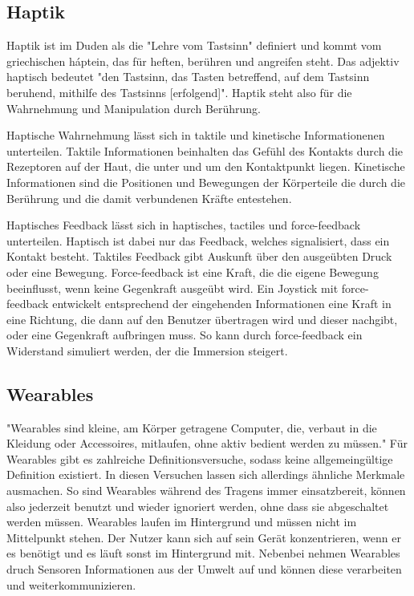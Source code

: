 \documentclass[ngerman,runningheads,a4paper]{llncs}
\begin{document}
\subsection{Haptik}
Haptik ist im Duden als die "Lehre vom Tastsinn"\cite{Haptik} definiert und kommt vom griechischen h\'{a}ptein, das für heften, berühren und angreifen steht. Das adjektiv haptisch bedeutet "den Tastsinn, das Tasten betreffend, auf dem Tastsinn beruhend, mithilfe des Tastsinns [erfolgend]"\cite{haptisch}. Haptik steht also für die Wahrnehmung und Manipulation durch Berührung.

Haptische Wahrnehmung lässt sich in taktile und kinetische Informationenen unterteilen. Taktile Informationen beinhalten das Gefühl des Kontakts durch die Rezeptoren auf der Haut, die unter und um den Kontaktpunkt liegen. Kinetische Informationen sind die Positionen und Bewegungen der Körperteile die durch die Berührung und die damit verbundenen Kräfte entestehen. \cite{srinivasan1995haptics}

Haptisches Feedback lässt sich in haptisches, tactiles und force-feedback unterteilen.
Haptisch ist dabei nur das Feedback, welches signalisiert, dass ein Kontakt besteht. Taktiles Feedback gibt Auskunft über den ausgeübten Druck oder eine Bewegung.
Force-feedback ist eine Kraft, die die eigene Bewegung beeinflusst, wenn keine Gegenkraft ausgeübt wird.
Ein Joystick mit force-feedback entwickelt entsprechend der eingehenden Informationen eine Kraft in eine Richtung, die dann auf den Benutzer übertragen wird und dieser nachgibt, oder eine Gegenkraft aufbringen muss.
So kann durch force-feedback ein Widerstand simuliert werden, der die Immersion steigert.\cite{bennett2004hap}



\subsection{Wearables}
"Wearables sind kleine, am Körper getragene Computer, die, verbaut in die Kleidung oder Accessoires, mitlaufen, ohne aktiv bedient werden zu müssen." \cite{kleine2016gesellschaftliche}
Für Wearables gibt es zahlreiche Definitionsversuche, sodass keine allgemeingültige Definition existiert. In diesen Versuchen lassen sich allerdings ähnliche Merkmale ausmachen. So sind Wearables während des Tragens immer einsatzbereit, können also jederzeit benutzt und wieder ignoriert werden, ohne dass sie abgeschaltet werden müssen. Wearables laufen im Hintergrund und müssen nicht im Mittelpunkt stehen. Der Nutzer kann sich auf sein Gerät konzentrieren, wenn er es benötigt und es läuft sonst im Hintergrund mit. Nebenbei nehmen Wearables druch Sensoren Informationen aus der Umwelt auf und können diese verarbeiten und weiterkommunizieren.\cite{kleine2016gesellschaftliche}
\end{document}
